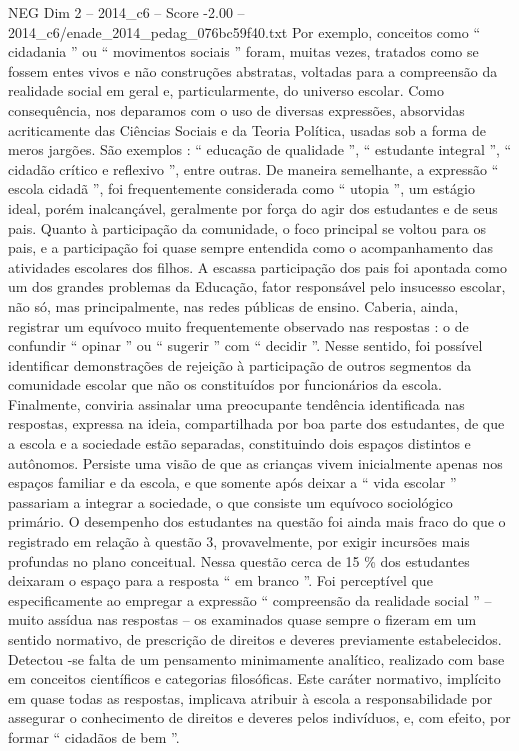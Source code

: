 \begin{textsample}{NEG Dim 2 – 2014\_c6 – Score -2.00 – 2014\_c6/enade\_2014\_pedag\_076bc59f40.txt}
Por exemplo, conceitos como “ cidadania ” ou “ movimentos sociais ” foram, muitas vezes, tratados como se fossem entes vivos e não construções abstratas, voltadas para a compreensão da realidade social em geral e, particularmente, do universo escolar.
Como consequência, nos deparamos com o uso de diversas expressões, absorvidas acriticamente das Ciências Sociais e da Teoria Política, usadas sob a forma de meros jargões.
São exemplos : “ educação de qualidade ”, “ estudante integral ”, “ cidadão crítico e reflexivo ”, entre outras.
De maneira semelhante, a expressão “ escola cidadã ”, foi frequentemente considerada como “ utopia ”, um estágio ideal, porém inalcançável, geralmente por força do agir dos estudantes e de seus pais.
Quanto à participação da comunidade, o foco principal se voltou para os pais, e a participação foi quase sempre entendida como o acompanhamento das atividades escolares dos filhos.
A escassa participação dos pais foi apontada como um dos grandes problemas da Educação, fator responsável pelo insucesso escolar, não só, mas principalmente, nas redes públicas de ensino.
Caberia, ainda, registrar um equívoco muito frequentemente observado nas respostas : o de confundir “ opinar ” ou “ sugerir ” com “ decidir ”.
Nesse sentido, foi possível identificar demonstrações de rejeição à participação de outros segmentos da comunidade escolar que não os constituídos por funcionários da escola.
Finalmente, conviria assinalar uma preocupante tendência identificada nas respostas, expressa na ideia, compartilhada por boa parte dos estudantes, de que a escola e a sociedade estão separadas, constituindo dois espaços distintos e autônomos.
Persiste uma visão de que as crianças vivem inicialmente apenas nos espaços familiar e da escola, e que somente após deixar a “ vida escolar ” passariam a integrar a sociedade, o que consiste um equívoco sociológico primário.
O desempenho dos estudantes na questão foi ainda mais fraco do que o registrado em relação à questão 3, provavelmente, por exigir incursões mais profundas no plano conceitual.
Nessa questão cerca de 15 \% dos estudantes deixaram o espaço para a resposta “ em branco ”.
Foi perceptível que especificamente ao empregar a expressão “ compreensão da realidade social ” – muito assídua nas respostas – os examinados quase sempre o fizeram em um sentido normativo, de prescrição de direitos e deveres previamente estabelecidos.
Detectou -se falta de um pensamento minimamente analítico, realizado com base em conceitos científicos e categorias filosóficas.
Este caráter normativo, implícito em quase todas as respostas, implicava atribuir à escola a responsabilidade por assegurar o conhecimento de direitos e deveres pelos indivíduos, e, com efeito, por formar “ cidadãos de bem ”.

\end{textsample}
